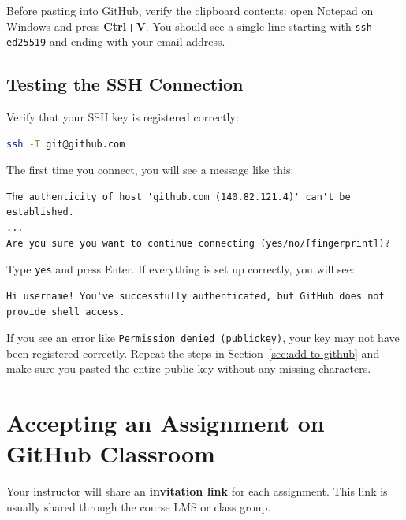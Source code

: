 \documentclass[
    a4paper,
    11pt,
    parskip=half
]{scrartcl}
\begin{document}
\begin{tipbox}
Before pasting into GitHub, verify the clipboard contents: open Notepad on Windows and press \textbf{Ctrl+V}. You should see a single line starting with \texttt{ssh-ed25519} and ending with your email address.
\end{tipbox}

\subsection{Testing the SSH Connection}

Verify that your SSH key is registered correctly:

\begin{lstlisting}[language=bash]
ssh -T git@github.com
\end{lstlisting}

The first time you connect, you will see a message like this:
\begin{lstlisting}
The authenticity of host 'github.com (140.82.121.4)' can't be established.
...
Are you sure you want to continue connecting (yes/no/[fingerprint])?
\end{lstlisting}

Type \texttt{yes} and press Enter. If everything is set up correctly, you will see:
\begin{lstlisting}
Hi username! You've successfully authenticated, but GitHub does not
provide shell access.
\end{lstlisting}

\begin{tipbox}
If you see an error like \texttt{Permission denied (publickey)}, your key may not have been registered correctly. Repeat the steps in Section~\ref{sec:add-to-github} and make sure you pasted the entire public key without any missing characters.
\end{tipbox}

\section{Accepting an Assignment on GitHub Classroom}
\label{sec:accept-assignment}

Your instructor will share an \textbf{invitation link} for each assignment. This link is usually shared through the course LMS or class group.
\end{document}

